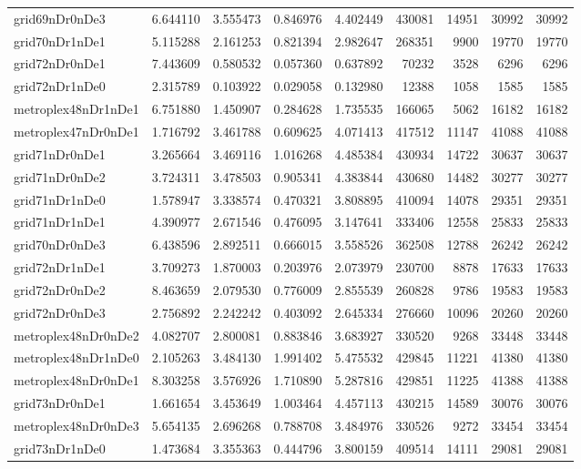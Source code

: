 \documentclass[../../../thesis.tex]{subfiles}
\begin{document}
\begin{longtable}{|l|r|r|r|r|r|r|r|r|}
grid69nDr0nDe3 & 6.644110 & 3.555473 & 0.846976 & 4.402449 & 430081 & 14951 & 30992 & 30992 \\
grid70nDr1nDe1 & 5.115288 & 2.161253 & 0.821394 & 2.982647 & 268351 & 9900 & 19770 & 19770 \\
grid72nDr0nDe1 & 7.443609 & 0.580532 & 0.057360 & 0.637892 & 70232 & 3528 & 6296 & 6296 \\
grid72nDr1nDe0 & 2.315789 & 0.103922 & 0.029058 & 0.132980 & 12388 & 1058 & 1585 & 1585 \\
metroplex48nDr1nDe1 & 6.751880 & 1.450907 & 0.284628 & 1.735535 & 166065 & 5062 & 16182 & 16182 \\
metroplex47nDr0nDe1 & 1.716792 & 3.461788 & 0.609625 & 4.071413 & 417512 & 11147 & 41088 & 41088 \\
grid71nDr0nDe1 & 3.265664 & 3.469116 & 1.016268 & 4.485384 & 430934 & 14722 & 30637 & 30637 \\
grid71nDr0nDe2 & 3.724311 & 3.478503 & 0.905341 & 4.383844 & 430680 & 14482 & 30277 & 30277 \\
grid71nDr1nDe0 & 1.578947 & 3.338574 & 0.470321 & 3.808895 & 410094 & 14078 & 29351 & 29351 \\
grid71nDr1nDe1 & 4.390977 & 2.671546 & 0.476095 & 3.147641 & 333406 & 12558 & 25833 & 25833 \\
grid70nDr0nDe3 & 6.438596 & 2.892511 & 0.666015 & 3.558526 & 362508 & 12788 & 26242 & 26242 \\
grid72nDr1nDe1 & 3.709273 & 1.870003 & 0.203976 & 2.073979 & 230700 & 8878 & 17633 & 17633 \\
grid72nDr0nDe2 & 8.463659 & 2.079530 & 0.776009 & 2.855539 & 260828 & 9786 & 19583 & 19583 \\
grid72nDr0nDe3 & 2.756892 & 2.242242 & 0.403092 & 2.645334 & 276660 & 10096 & 20260 & 20260 \\
metroplex48nDr0nDe2 & 4.082707 & 2.800081 & 0.883846 & 3.683927 & 330520 & 9268 & 33448 & 33448 \\
metroplex48nDr1nDe0 & 2.105263 & 3.484130 & 1.991402 & 5.475532 & 429845 & 11221 & 41380 & 41380 \\
metroplex48nDr0nDe1 & 8.303258 & 3.576926 & 1.710890 & 5.287816 & 429851 & 11225 & 41388 & 41388 \\
grid73nDr0nDe1 & 1.661654 & 3.453649 & 1.003464 & 4.457113 & 430215 & 14589 & 30076 & 30076 \\
metroplex48nDr0nDe3 & 5.654135 & 2.696268 & 0.788708 & 3.484976 & 330526 & 9272 & 33454 & 33454 \\
grid73nDr1nDe0 & 1.473684 & 3.355363 & 0.444796 & 3.800159 & 409514 & 14111 & 29081 & 29081 \\

\end{longtable}
\end{document}
